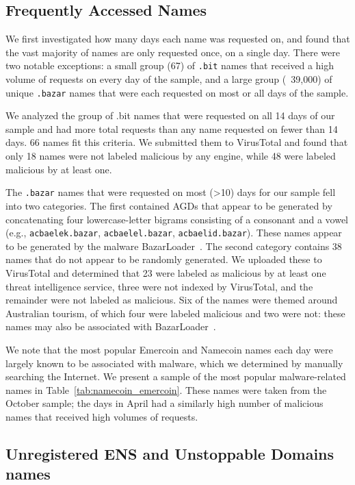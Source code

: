 \subsection{Frequently Accessed Names}

We first investigated how many days each name was requested on, and found that 
the vast majority of names are only requested once, on a single day. There were 
two notable exceptions: a small group (67) of \texttt{.bit} names that received 
a high volume of requests on every day of the sample, and a large group 
(~39,000) of unique \texttt{.bazar} names that 
were each requested on most or all days of the sample.

We analyzed the group of .bit names that were requested on all 14 days of our 
sample and had more total requests than any name requested on fewer than 14 
days. 66 names fit this criteria. We submitted them to VirusTotal and found 
that only 18 names were not labeled malicious by any engine, while 48 were 
labeled malicious by at least one. 

The \texttt{.bazar} names that were requested on most (>10) days for our sample 
fell into two categories. The first 
contained AGDs that appear to be generated by concatenating four 
lowercase-letter bigrams consisting of a consonant and a vowel (e.g., 
\texttt{acbaelek.bazar}, \texttt{acbaelel.bazar}, \texttt{acbaelid.bazar}). 
These names appear to be 
generated by the 
malware BazarLoader~\cite{bazarloader_dga}. The second category contains 38 
names that do not appear to be randomly generated. We uploaded these to 
VirusTotal and determined that 23 were labeled as malicious by at least one 
threat intelligence service, three were not indexed by VirusTotal, and the 
remainder were not labeled as malicious. Six of the names were themed around 
Australian tourism, of which four were labeled malicious and two were not: 
these names may also be associated with 
BazarLoader~\cite{alienvault_bazarloader}. 

We note that the most popular Emercoin and Namecoin names each day were largely 
known to be associated with malware, which we determined by manually searching 
the Internet. We present a sample of the most popular malware-related names in 
Table~\ref{tab:namecoin_emercoin}. These names were 
taken from the October sample; the days in April had a similarly high number of 
malicious names that received high volumes of requests. 

\subsection{Unregistered ENS and Unstoppable Domains names}
 
